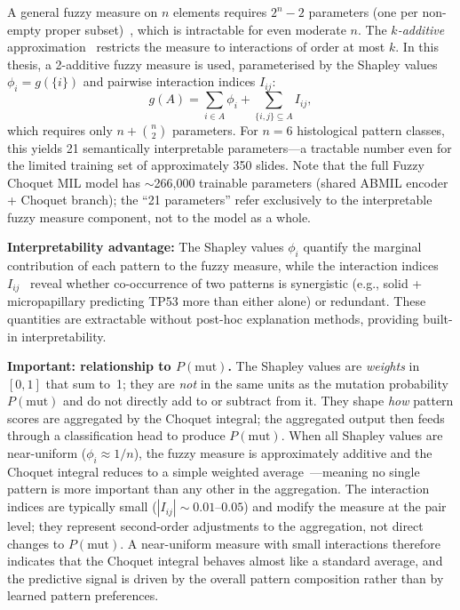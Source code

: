 A general fuzzy measure on $n$ elements requires $2^n - 2$ parameters (one per non-empty proper subset)~\cite{grabisch2009aggregation}, which is intractable for even moderate $n$.
The \emph{$k$-additive} approximation~\cite{grabisch1997kapprox} restricts the measure to interactions of order at most $k$.
In this thesis, a 2-additive fuzzy measure is used, parameterised by the Shapley values~\cite{shapley1953value} $\phi_i = g(\{i\})$ and pairwise interaction indices $I_{ij}$:
\begin{equation}
\label{eq:2additive}
g(A) = \sum_{i \in A} \phi_i + \sum_{\{i,j\} \subseteq A} I_{ij},
\end{equation}
which requires only $n + \binom{n}{2}$ parameters.
For $n = 6$ histological pattern classes, this yields 21 semantically interpretable parameters---a tractable number even for the limited training set of approximately 350 slides.
Note that the full Fuzzy Choquet MIL model has $\sim$266{,}000 trainable parameters (shared ABMIL encoder + Choquet branch); the ``21 parameters'' refer exclusively to the interpretable fuzzy measure component, not to the model as a whole.

\textbf{Interpretability advantage:} The Shapley values $\phi_i$ quantify the marginal contribution of each pattern to the fuzzy measure, while the interaction indices $I_{ij}$~\cite{grabisch2009aggregation} reveal whether co-occurrence of two patterns is synergistic (e.g., solid + micropapillary predicting TP53 more than either alone) or redundant.
These quantities are extractable without post-hoc explanation methods, providing built-in interpretability.

\textbf{Important: relationship to $P(\text{mut})$.}
The Shapley values are \emph{weights} in $[0,1]$ that sum to~1; they are \emph{not} in the same units as the mutation probability $P(\text{mut})$ and do not directly add to or subtract from it.
They shape \emph{how} pattern scores are aggregated by the Choquet integral; the aggregated output then feeds through a classification head to produce $P(\text{mut})$.
When all Shapley values are near-uniform ($\phi_i \approx 1/n$), the fuzzy measure is approximately additive and the Choquet integral reduces to a simple weighted average~\cite{grabisch2000choquet}---meaning no single pattern is more important than any other in the aggregation.
The interaction indices are typically small ($|I_{ij}| \sim 0.01\text{--}0.05$) and modify the measure at the pair level; they represent second-order adjustments to the aggregation, not direct changes to $P(\text{mut})$.
A near-uniform measure with small interactions therefore indicates that the Choquet integral behaves almost like a standard average, and the predictive signal is driven by the overall pattern composition rather than by learned pattern preferences.

